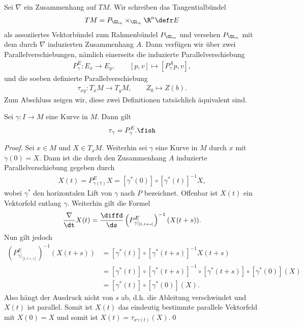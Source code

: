 \documentclass[%
	paper=a5,%
	fleqn,%
	DIV=18,%
	BCOR=0mm,
	fontsize=11pt,
	titlepage=false,%
	bibliography=totoc,
	DIV=18,%
	twoside=true,
	pdftitle=Riemannsche Geometrie,
	pdfauthor=Uwe Semmelmann,
	numbers=noendperiod]%
	{scrbook}
\begin{document}
Sei $\nabla$ ein Zusammenhang auf $TM$. Wir schreiben das Tangentialbündel
\begin{align*}
TM = P_{\GL_n}\times_{\GL_n} \R^n \defr E
\end{align*}
als assoziiertes Vektorbündel zum Rahmenbündel $P_{\GL_n}$ und versehen
$P_{\GL_n}$ mit dem durch $\nabla$ induzierten Zusammenhang $A$. Dann verfügen
wir über zwei Parallelverschiebungen, nämlich einerseits die induzierte
Parallelverschiebung
\begin{align*}
P^E_\gamma: E_x\to E_y,\qquad [p,v]\mapsto [P_\gamma^A p,v], 
\end{align*}
und die soeben definierte Parallelverschiebung
\begin{align*}
\tau_{xy}: T_xM\to T_yM,\qquad Z_0\mapsto Z(b). 
\end{align*}
Zum Abschluss zeigen wir, diese zwei Definitionen tatsächlich äquivalent sind.

\begin{prop}
Sei $\gamma: I\to M$ eine Kurve in $M$. Dann gilt
\begin{align*}
\tau_{\gamma} = P^E_{\gamma}.\fish
\end{align*}
\end{prop}
\begin{proof}
Sei $x\in M$ und $X\in T_xM$. Weiterhin sei $\gamma$ eine Kurve in $M$ durch $x$
mit $\dot{\gamma}(0) = X$. Dann ist die durch den Zusammenhang $A$ induzierte
Parallelverschiebung gegeben durch
\begin{align*}
X(t) = P^E_{\gamma(t)}X = [\gamma^*(0)]\circ [\gamma^*(t)]^{-1}X,
\end{align*}
wobei $\gamma^*$ den horizontalen Lift von $\gamma$ nach $P$ bezeichnet.
Offenbar ist $X(t)$ ein Vektorfeld entlang $\gamma$. Weiterhin gilt die Formel
\begin{align*}
\frac{\nabla}{\dt} X(t) = \frac{\diffd}{\ds}
\left(P_{\gamma|_{[t,t+s]}}^E\right)^{-1}(X(t+s)).
\end{align*}
Nun gilt jedoch
\begin{align*}
\left(P_{\gamma|_{[t,t+s]}}^E\right)^{-1}(X(t+s)) &=
[\gamma^*(t)]\circ [\gamma^*(t+s)]^{-1} X(t+s)\\
&= [\gamma^*(t)]\circ
[\gamma^*(t+s)]^{-1} \circ [\gamma^*(t+s)]\circ [\gamma^*(0)](X)\\
&= [\gamma^*(t)]\circ [\gamma^*(0)](X).
\end{align*}
Also hängt der Ausdruck nicht von $s$ ab, d.h. die Ableitung verschwindet
und $X(t)$ ist parallel. Somit ist $X(t)$ das eindeutig bestimmte parallele
Vektorfeld mit $X(0) = X$ und somit ist $X(t) = \tau_{x\gamma(t)}(X)$.\qed
\end{proof}
\end{document}

